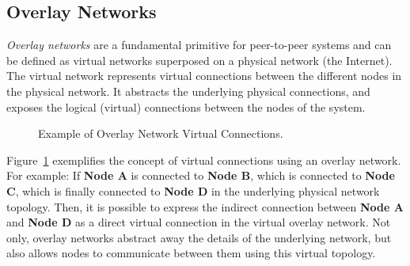 \documentclass[12pt, titlepage]{uo_temp}
\begin{document}
     \subsection{Overlay Networks}\label{bkg_overlay}
     \emph{Overlay networks} are a fundamental primitive for peer-to-peer systems and can
     be defined as virtual networks superposed on a physical network (the Internet).
     The virtual network represents virtual connections between the different nodes in
     the physical network. It abstracts the underlying physical connections, and exposes
     the logical
     (virtual) connections between the nodes of the system.\\
     
     \begin{figure}[h!]
       \centering
       \caption{Example of Overlay Network Virtual Connections.\label{overlay_fig}}
     \end{figure}

     Figure~\ref{overlay_fig} exemplifies the concept of virtual connections using an
     overlay network. For example: If \textbf{Node A} is connected to \textbf{Node B},
     which is connected to \textbf{Node C}, which is finally connected to \textbf{Node D}
     in the underlying physical network topology. Then, it is possible to express the
     indirect connection between \textbf{Node A} and \textbf{Node D} as a direct virtual
     connection in the virtual overlay network. Not only, overlay networks abstract away
     the details of the underlying network, but also allows nodes to communicate between
     them using this virtual topology.
\end{document}
